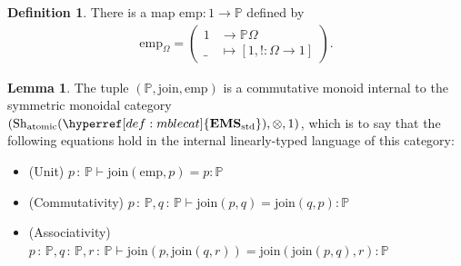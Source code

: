 \documentclass[
  sigconf,
  screen, ]{acmart}
\theoremstyle{definition}
\newtheorem{lemma}[theorem]{Lemma}
\newtheorem{definition}[theorem]{Definition}
\newcommand\ofty{\,{:}\,}
\newcommand\nref[2]{\hyperref[#1]{#2}} \newcommand\checkhigh{{\huge{\color{red}\textbf{TODO: check}}}}
\newcommand\Shjat{\operatorname{Sh}_{{\rm atomic}}}
\newcommand\shotimes{\mathop{\otimes}}
\newcommand\texStdMble{\mathbf{EMS}_{\rm std}}
\newcommand\StdMble{{\nref{def:mblecat}{\texStdMble}}}
\newcommand\pcmjoin{{\nref{app:def:pspcs-tensor-join}{\mathrm{join}}}}
\newcommand\pcmunit{{\nref{app:def:pspcs-join-unit}{\mathrm{emp}}}}
\newcommand\texpspcs{\mathbb P}
\newcommand\pspcs{{\nref{def:mble-pspcs}{\texpspcs}}}
\begin{document}
\begin{definition} \label{app:def:pspcs-join-unit}
  There is a map $\pcmunit : 1\to\pspcs$
  defined by
  \begin{align*}
    \pcmunit_\Omega = \left(\begin{aligned}
      1 &\to \pspcs\Omega \\
      \_ &\mapsto [1, ! : \Omega\to 1]
    \end{aligned}\right).
  \end{align*}
\end{definition}

\begin{lemma} \label{app:def:pspcs-join-unit-cm}
  The tuple $(\pspcs, \pcmjoin,\pcmunit)$ is
  a commutative monoid internal to the symmetric monoidal
  category $(\Shjat(\StdMble), \shotimes, 1)$,
  which is to say that the following equations hold in the
  internal linearly-typed language of this category:
  \begin{itemize}
    \item (Unit) $p \ofty \pspcs \vdash \pcmjoin(\pcmunit, p) = p : \pspcs$
    \item (Commutativity) $p\ofty\pspcs,q\ofty\pspcs\vdash\pcmjoin(p, q) = \pcmjoin(q, p) : \pspcs$
    \item (Associativity) $p\ofty\pspcs,q\ofty\pspcs,r\ofty\pspcs\vdash\pcmjoin(p, \pcmjoin(q, r))
      = \pcmjoin(\pcmjoin(p, q), r) : \pspcs$
  \end{itemize}
\end{lemma}
\end{document}
